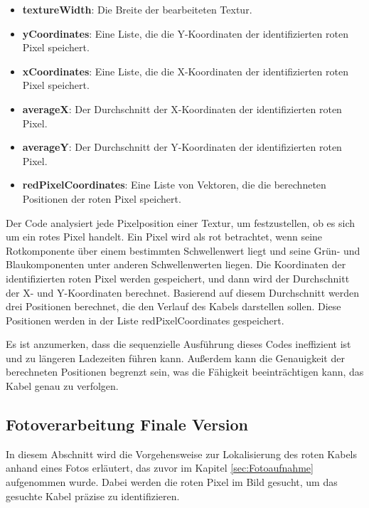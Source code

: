 \begin{itemize}
    \item \textbf{textureWidth}: Die Breite der bearbeiteten Textur.
    \item \textbf{yCoordinates}: Eine Liste, die die Y-Koordinaten der identifizierten roten Pixel speichert.
    \item \textbf{xCoordinates}: Eine Liste, die die X-Koordinaten der identifizierten roten Pixel speichert.
    \item \textbf{averageX}: Der Durchschnitt der X-Koordinaten der identifizierten roten Pixel.
    \item \textbf{averageY}: Der Durchschnitt der Y-Koordinaten der identifizierten roten Pixel.
    \item \textbf{redPixelCoordinates}: Eine Liste von Vektoren, die die berechneten Positionen der roten Pixel speichert.
\end{itemize}

Der Code analysiert jede Pixelposition einer Textur, um festzustellen, ob es sich um ein rotes Pixel handelt. Ein Pixel wird als rot betrachtet, wenn seine Rotkomponente über einem bestimmten Schwellenwert liegt und seine Grün- und Blaukomponenten unter anderen Schwellenwerten liegen. Die Koordinaten der identifizierten roten Pixel werden gespeichert, und dann wird der Durchschnitt der X- und Y-Koordinaten berechnet. Basierend auf diesem Durchschnitt werden drei Positionen berechnet, die den Verlauf des Kabels darstellen sollen. Diese Positionen werden in der Liste redPixelCoordinates gespeichert.

Es ist anzumerken, dass die sequenzielle Ausführung dieses Codes ineffizient ist und zu längeren Ladezeiten führen kann. Außerdem kann die Genauigkeit der berechneten Positionen begrenzt sein, was die Fähigkeit beeinträchtigen kann, das Kabel genau zu verfolgen.


\subsection{Fotoverarbeitung Finale Version}
In diesem Abschnitt wird die Vorgehensweise zur Lokalisierung des roten Kabels anhand eines Fotos erläutert, das zuvor im Kapitel \ref{sec:Fotoaufnahme} aufgenommen wurde. Dabei werden die roten Pixel im Bild gesucht, um das gesuchte Kabel präzise zu identifizieren.


